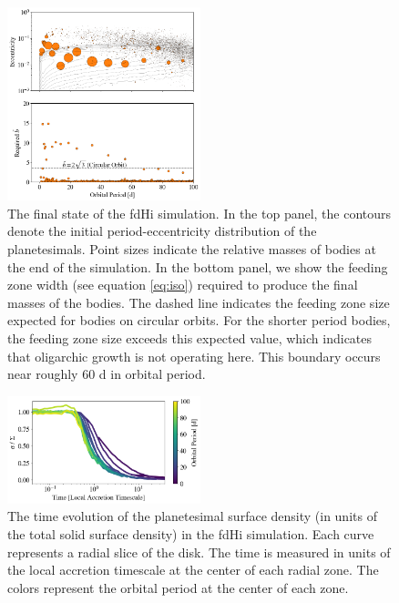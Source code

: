 \documentclass[twocolumn,linenumbers]{aastex63}
\begin{document}
\begin{figure}
\begin{center}
    \includegraphics[width=0.5\textwidth]{figures/fulldisk_e_m_b.png}
    \caption{The final state of the fdHi simulation. In the top panel,
      the contours denote the initial period-eccentricity distribution
      of the planetesimals. Point sizes indicate the relative masses
      of bodies at the end of the simulation. In the bottom panel, we show the
      feeding zone width (see equation \ref{eq:iso}) required to produce
      the final masses of the bodies. The dashed line indicates the feeding
      zone size expected for bodies on circular orbits. For the shorter period bodies,
      the feeding zone size exceeds this expected value, which indicates that oligarchic growth is
      not operating here. This boundary occurs near roughly 60 d in orbital period.\label{fig:fulldisk_e_m}}
\end{center}
\end{figure}

\begin{figure}
\begin{center}
    \includegraphics[width=0.5\textwidth]{figures/pl_frac_time.png}
    \caption{The time evolution of the planetesimal surface density (in units of the total solid surface density) in the fdHi 
    simulation. Each curve represents a radial slice of the disk. The time is measured in units of the local accretion 
    timescale at the center of each radial zone. The colors represent the orbital period at the center of each zone.\label{fig:pl_frac_time}}
\end{center}
\end{figure}
\end{document}
